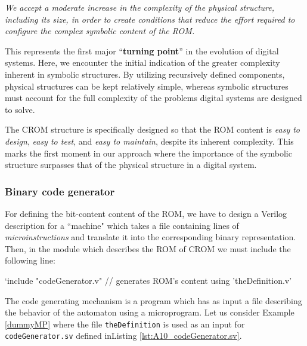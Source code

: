 {\em We accept a moderate increase in the complexity of the physical 
structure, including its size, in order to create conditions that reduce the effort required to configure the complex symbolic content of the ROM.}

This represents the first major ``{\bf turning point}'' in the evolution of digital systems. Here, we encounter the initial indication of the greater complexity inherent in symbolic structures. By utilizing recursively defined components, physical structures can be kept relatively simple, whereas symbolic structures must account for the full complexity of the problems digital systems are designed to solve. 

The CROM structure is specifically designed so that the ROM content is {\em easy to design}, {\em easy to test}, and {\em easy to maintain}, despite its inherent complexity. This marks the first moment in our approach where the importance of the symbolic structure surpasses that of the physical structure in a digital system.


\subsubsection{Binary code generator}\label{binGen}


For defining the bit-content content of the ROM,
we have to design a Verilog description for a ``machine" which
takes a file containing lines of {\em microinstructions} and
translate it into the corresponding binary representation. Then,
in the module which describes the ROM of CROM we must include the following line: 
\begin{verilogcode}
  `include "codeGenerator.v" // generates ROM's content using 'theDefinition.v'
\end{verilogcode}

The code generating mechanism is a program which has as input a file describing the behavior of the automaton using a microprogram. Let us consider  Example \ref{dummyMP} where the file {\tt theDefinition} is used  as an input for {\tt codeGenerator.sv}  defined inListing \ref{lst:A10_codeGenerator.sv}.


